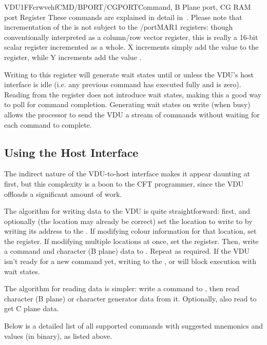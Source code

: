 \begin{ioport}{VDU}{1FF}{crwvehf}{CMD/BPORT/CGPORT}{Command, B Plane port, CG RAM port Register}
  These commands are explained in detail
  in~. Please note that incrementation of the
   is not subject to the /port{MAR1} registers: though
  conventionally interpreted as a column/row vector register, this is really a
  16-bit scalar register incremented as a whole. X increments simply add the
  value  to the register, while Y increments add the value
  .

  Writing to this register will generate wait states until or unless the VDU's
  host interface is idle (i.e. any previous command has executed fully
  and  is zero). Reading from the register does not introduce wait
  states, making this a good way to poll for command completion. Generating
  wait states on write (when busy) allows the processor to send the VDU a
  stream of commands without waiting for each command to complete.

\end{ioport}

\subsection{Using the Host Interface}
\label{sec:vdu:using-host-iface}

The indirect nature of the VDU-to-host interface makes it appear daunting at
first, but this complexity is a boon to the CFT programmer, since the VDU
offloads a significant amount of work.

The algorithm for writing data to the VDU is quite straightforward: first, and
optionally (the location may already be correct) set the location to write to
by writing its address to the . If modifying colour information for
that location, set the  register. If modifying multiple locations
at once, set the  register. Then, write a command and character (B
plane) data to . Repeat as required. If the VDU isn't ready for a new
command yet, writing to the ,  or  will block
execution with wait states.

The algorithm for reading data is simpler: write a command to , then
read character (B plane) or character generator data from it. Optionally, also
read  to get C plane data.

Below is a detailed list of all supported commands with suggested mnemonics and
values (in binary), as listed above.

